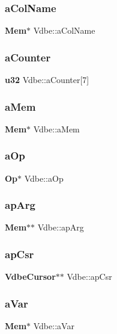 \subsubsection{aColName}
{\footnotesize\ttfamily \textbf{ Mem}$\ast$ Vdbe\+::a\+Col\+Name}

\mbox{\label{struct_vdbe_a423327ceb7c76869af080633cbe2be57}} 
\subsubsection{aCounter}
{\footnotesize\ttfamily \textbf{ u32} Vdbe\+::a\+Counter[7]}

\mbox{\label{struct_vdbe_ac36776c53b6ec9054a2826ec83f29953}} 
\subsubsection{aMem}
{\footnotesize\ttfamily \textbf{ Mem}$\ast$ Vdbe\+::a\+Mem}

\mbox{\label{struct_vdbe_a1ba82f08947b275dd72a3e3095ad02d5}} 
\subsubsection{aOp}
{\footnotesize\ttfamily \textbf{ Op}$\ast$ Vdbe\+::a\+Op}

\mbox{\label{struct_vdbe_a74fd4612c55ac2fde475096a4d2605b5}} 
\subsubsection{apArg}
{\footnotesize\ttfamily \textbf{ Mem}$\ast$$\ast$ Vdbe\+::ap\+Arg}

\mbox{\label{struct_vdbe_a8bd1b6ecdc16918e10ee1ae90b4e19ef}} 
\subsubsection{apCsr}
{\footnotesize\ttfamily \textbf{ Vdbe\+Cursor}$\ast$$\ast$ Vdbe\+::ap\+Csr}

\mbox{\label{struct_vdbe_a8877b72591926e3597fa93e22f84b99c}} 
\subsubsection{aVar}
{\footnotesize\ttfamily \textbf{ Mem}$\ast$ Vdbe\+::a\+Var}

